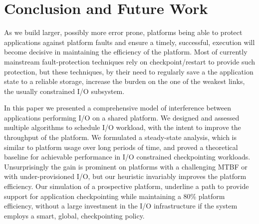 \section{Conclusion and Future Work}
\label{sec:conclusion}
As we build larger, possibly more error prone, platforms being able to protect
applications against platform faults and ensure a timely, successful, execution
will become decisive in maintaining the efficiency of the platform. Most of
currently mainstream fault-protection techniques rely on checkpoint/restart to
provide such protection, but these techniques, by their need to regularly save a
the application state to a reliable storage, increase the burden on the one of
the weakest links, the usually constrained I/O subsystem.

In this paper we presented a comprehensive model of interference between
applications performing I/O on a shared platform. We designed and assessed
multiple algorithms to schedule I/O workload, with the intent to improve the
throughput of the platform. We formulated a steady-state analysis, which is
similar to platform usage over long periods of time, and proved a theoretical
baseline for achievable performance in I/O constrained checkpointing workloads.
Unsurprisingly the gain is prominent on platforms with a challenging MTBF or
with under-provisioned I/O, but our heuristic invariably improves the platform
efficiency. Our simulation of a prospective platform, underline a path to
provide support for application checkpointing while maintaining a 80\% platform
efficiency, without a large investment in the I/O infrastructure if the system
employs a smart, global, checkpointing policy.


